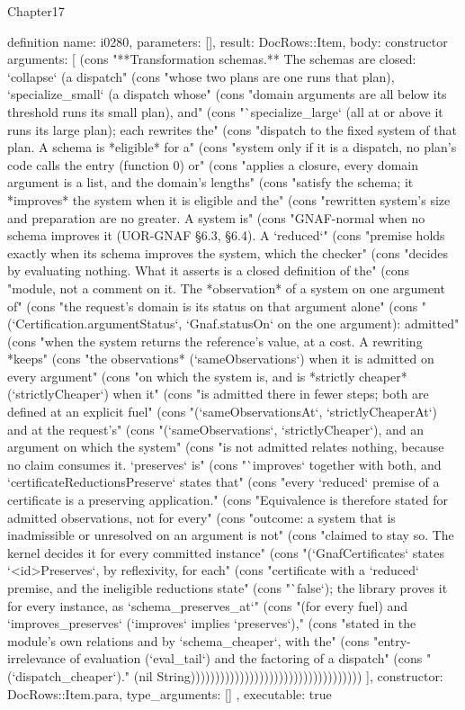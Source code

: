 \begin{lexlean}{Chapter17}
\begin{semanticmodule}
definition{
  name: i0280,
  parameters: [],
  result: DocRows::Item,
  body: constructor{
    arguments: [
      (cons "**Transformation schemas.** The schemas are closed: `collapse` (a dispatch" (cons "whose two plans are one runs that plan), `specialize_small` (a dispatch whose" (cons "domain arguments are all below its threshold runs its small plan), and" (cons "`specialize_large` (all at or above it runs its large plan); each rewrites the" (cons "dispatch to the fixed system of that plan. A schema is *eligible* for a" (cons "system only if it is a dispatch, no plan's code calls the entry (function 0) or" (cons "applies a closure, every domain argument is a list, and the domain's lengths" (cons "satisfy the schema; it *improves* the system when it is eligible and the" (cons "rewritten system's size and preparation are no greater. A system is" (cons "GNAF-normal when no schema improves it (UOR-GNAF §6.3, §6.4). A `reduced`" (cons "premise holds exactly when its schema improves the system, which the checker" (cons "decides by evaluating nothing. What it asserts is a closed definition of the" (cons "module, not a comment on it. The *observation* of a system on one argument of" (cons "the request's domain is its status on that argument alone" (cons "(`Certification.argumentStatus`, `Gnaf.statusOn` on the one argument): admitted" (cons "when the system returns the reference's value, at a cost. A rewriting *keeps" (cons "the observations* (`sameObservations`) when it is admitted on every argument" (cons "on which the system is, and is *strictly cheaper* (`strictlyCheaper`) when it" (cons "is admitted there in fewer steps; both are defined at an explicit fuel" (cons "(`sameObservationsAt`, `strictlyCheaperAt`) and at the request's" (cons "(`sameObservations`, `strictlyCheaper`), and an argument on which the system" (cons "is not admitted relates nothing, because no claim consumes it. `preserves` is" (cons "`improves` together with both, and `certificateReductionsPreserve` states that" (cons "every `reduced` premise of a certificate is a preserving application." (cons "Equivalence is therefore stated for admitted observations, not for every" (cons "outcome: a system that is inadmissible or unresolved on an argument is not" (cons "claimed to stay so. The kernel decides it for every committed instance" (cons "(`GnafCertificates` states `<id>Preserves`, by reflexivity, for each" (cons "certificate with a `reduced` premise, and the ineligible reductions state" (cons "`false`); the library proves it for every instance, as `schema_preserves_at`" (cons "(for every fuel) and `improves_preserves` (`improves` implies `preserves`)," (cons "stated in the module's own relations and by `schema_cheaper`, with the" (cons "entry-irrelevance of evaluation (`eval_tail`) and the factoring of a dispatch" (cons "(`dispatch_cheaper`)." (nil String)))))))))))))))))))))))))))))))))))
    ],
    constructor: DocRows::Item.para,
    type_arguments: []
  },
  executable: true
}


\end{semanticmodule}
\end{lexlean}
